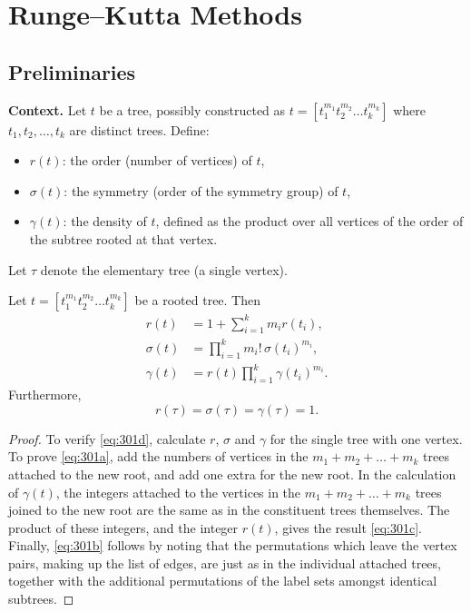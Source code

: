 \chapter{Runge–Kutta Methods}

\section{Preliminaries}

\noindent\textbf{Context.}
Let $t$ be a tree, possibly constructed as $t = [t_{1}^{m_{1}} t_{2}^{m_{2}} \dots t_{k}^{m_{k}}]$ where $t_{1}, t_{2}, \dots, t_{k}$ are distinct trees. Define:
\begin{itemize}
    \item $r(t)$: the order (number of vertices) of $t$,
    \item $\sigma(t)$: the symmetry (order of the symmetry group) of $t$,
    \item $\gamma(t)$: the density of $t$, defined as the product over all vertices of the order of the subtree rooted at that vertex.
\end{itemize}
Let $\tau$ denote the elementary tree (a single vertex).

\begin{theorem}

  \label{thm:301A}
  \uses{}
Let $t = [t_1^{m_1} t_2^{m_2} \dots t_k^{m_k}]$ be a rooted tree. Then
\begin{align}
r(t) &= 1 + \sum_{i=1}^k m_i r(t_i), \label{eq:301a} \\
\sigma(t) &= \prod_{i=1}^k m_i! \, \sigma(t_i)^{m_i}, \label{eq:301b} \\
\gamma(t) &= r(t) \prod_{i=1}^k \gamma(t_i)^{m_i}. \label{eq:301c}
\end{align}
Furthermore,
\begin{equation}
r(\tau) = \sigma(\tau) = \gamma(\tau) = 1. \label{eq:301d}
\end{equation}
\end{theorem}

\begin{proof}

To verify \eqref{eq:301d}, calculate $r$, $\sigma$ and $\gamma$ for the single tree with one vertex. To prove \eqref{eq:301a}, add the numbers of vertices in the $m_1 + m_2 + \dots + m_k$ trees attached to the new root, and add one extra for the new root. In the calculation of $\gamma(t)$, the integers attached to the vertices in the $m_1 + m_2 + \dots + m_k$ trees joined to the new root are the same as in the constituent trees themselves. The product of these integers, and the integer $r(t)$, gives the result \eqref{eq:301c}. Finally, \eqref{eq:301b} follows by noting that the permutations which leave the vertex pairs, making up the list of edges, are just as in the individual attached trees, together with the additional permutations of the label sets amongst identical subtrees.
\end{proof}

